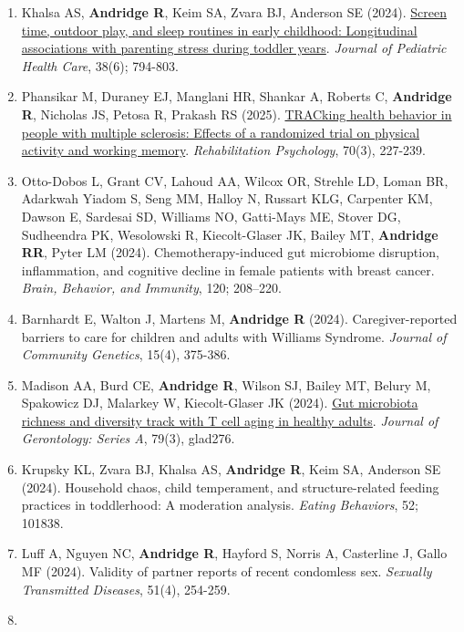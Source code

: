 \documentclass[
  english,
  letterpaper,
  DIV=11,
  numbers=noendperiod]{scrartcl}
\begin{document}
\begin{enumerate}
{  resistance in a mouse model of chemotherapy}. \emph{Nutrition
  Research}, 131; 39-53.
\item
  Khalsa AS, \textbf{Andridge R}, Keim SA, Zvara BJ, Anderson SE (2024).
  \href{https://doi.org/10.1016/j.pedhc.2024.07.003}{Screen time,
  outdoor play, and sleep routines in early childhood: Longitudinal
  associations with parenting stress during toddler years}.
  \emph{Journal of Pediatric Health Care}, 38(6); 794-803.
\item
  Phansikar M, Duraney EJ, Manglani HR, Shankar A, Roberts C,
  \textbf{Andridge R}, Nicholas JS, Petosa R, Prakash RS (2025).
  \href{https://doi.org/10.1037/rep0000578}{TRACking health behavior in
  people with multiple sclerosis: Effects of a randomized trial on
  physical activity and working memory}. \emph{Rehabilitation
  Psychology}, 70(3), 227-239.
\item
  Otto-Dobos L, Grant CV, Lahoud AA, Wilcox OR, Strehle LD, Loman BR,
  Adarkwah Yiadom S, Seng MM, Halloy N, Russart KLG, Carpenter KM,
  Dawson E, Sardesai SD, Williams NO, Gatti-Mays ME, Stover DG,
  Sudheendra PK, Wesolowski R, Kiecolt-Glaser JK, Bailey MT,
  \textbf{Andridge RR}, Pyter LM (2024). Chemotherapy-induced gut
  microbiome disruption, inflammation, and cognitive decline in female
  patients with breast cancer. \emph{Brain, Behavior, and Immunity},
  120; 208--220.
\item
  Barnhardt E, Walton J, Martens M, \textbf{Andridge R} (2024).
  Caregiver-reported barriers to care for children and adults with
  Williams Syndrome. \emph{Journal of Community Genetics}, 15(4),
  375-386.
\item
  Madison AA, Burd CE, \textbf{Andridge R}, Wilson SJ, Bailey MT, Belury
  M, Spakowicz DJ, Malarkey W, Kiecolt-Glaser JK (2024).
  \href{https://doi.org/10.1093/gerona/glad276}{Gut microbiota richness
  and diversity track with T cell aging in healthy adults}.
  \emph{Journal of Gerontology: Series A}, 79(3), glad276.
\item
  Krupsky KL, Zvara BJ, Khalsa AS, \textbf{Andridge R}, Keim SA,
  Anderson SE (2024). Household chaos, child temperament, and
  structure-related feeding practices in toddlerhood: A moderation
  analysis. \emph{Eating Behaviors}, 52; 101838.
\item
  Luff A, Nguyen NC, \textbf{Andridge R}, Hayford S, Norris A,
  Casterline J, Gallo MF (2024). Validity of partner reports of recent
  condomless sex. \emph{Sexually Transmitted Diseases}, 51(4), 254-259.
\item

\end{enumerate}
\end{document}
